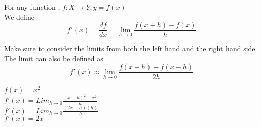\documentclass{book}
\newtheorem{definition}{Definition}[section]
\begin{document}
\begin{tcolorbox}[width=\textwidth,colback={mygray},title={\begin{definition}Derivative of a continuous function\end{definition}},colbacktitle=mygreen,coltitle=black]    

For any function , $f: X \to Y , y = f(x)$\\
We define $$f'(x)  =  \displaystyle\frac{df}{dx} = \lim_{h \to 0}\displaystyle\frac{f(x+h)-f(x)}{h}$$
\end{tcolorbox}

Make sure to consider the limits from both the left hand and the right hand side.\\

The limit can also be defined as $$f'(x)  \approx  \lim_{h \to 0}\displaystyle\frac{f(x+h)-f(x-h)}{2h}$$

\begin{tcolorbox}[width=\textwidth,colback={mygray},title={Example},colbacktitle=myred,coltitle=black]    

$f(x) = x^2$\\
$f'(x)  = Lim_{h \to 0}\displaystyle\frac{(x+h)^2-x^2}{h}$\\
       $f'(x)= Lim_{h \to 0}\displaystyle\frac{(2x+h)(h)}{h}$\\
       $f'(x)  = 2x$\\
\end{tcolorbox}
\end{document}
